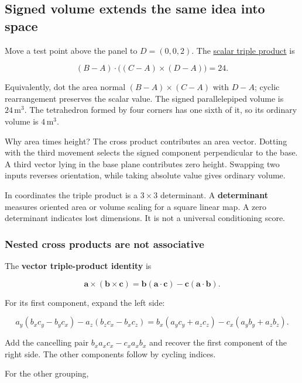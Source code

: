 \subsection{Signed volume extends the same idea into space}\label{01-foundations-i-ch017-signed-volume-extends-the-same-idea-into-space}

Move a test point above the panel to \(D=(0,0,2)\). The \hyperref[01-foundations-i-ch017-signed-volume-extends-the-same-idea-into-space]{scalar triple product} is

\[
(B-A)\cdot\big((C-A)\times(D-A)\big)=24.
\]

Equivalently, dot the area normal \((B-A)\times(C-A)\) with \(D-A\); cyclic rearrangement preserves the scalar value. The signed parallelepiped volume is \(24\,\mathrm{m}^3\). The tetrahedron formed by four corners has one sixth of it, so its ordinary volume is \(4\,\mathrm{m}^3\).

Why area times height? The cross product contributes an area vector. Dotting with the third movement selects the signed component perpendicular to the base. A third vector lying in the base plane contributes zero height. Swapping two inputs reverses orientation, while taking absolute value gives ordinary volume.

In coordinates the triple product is a \(3\times3\) determinant. A \textbf{determinant} measures oriented area or volume scaling for a square linear map. A zero determinant indicates lost dimensions. It is not a universal conditioning score.

\subsubsection{Nested cross products are not associative}\label{01-foundations-i-ch017-nested-cross-products-are-not-associative}

The \textbf{vector triple-product identity} is

\[
\mathbf a\times(\mathbf b\times\mathbf c)
=\mathbf b(\mathbf a\cdot\mathbf c)-\mathbf c(\mathbf a\cdot\mathbf b).
\]

For its first component, expand the left side:

\[
a_y(b_xc_y-b_yc_x)-a_z(b_zc_x-b_xc_z)
=b_x(a_yc_y+a_zc_z)-c_x(a_yb_y+a_zb_z).
\]

Add the cancelling pair \(b_xa_xc_x-c_xa_xb_x\) and recover the first component of the right side. The other components follow by cycling indices.

For the other grouping,

